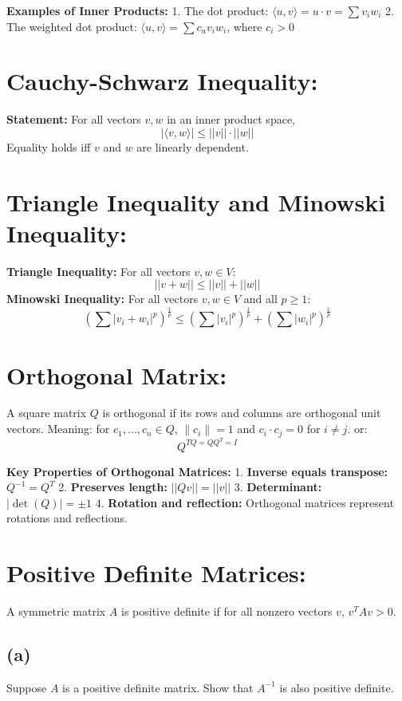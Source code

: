 \documentclass[11pt]{article}
\begin{document}
    \textbf{Examples of Inner Products:}
    1.
    The dot product: $\langle u, v \rangle = u \cdot v = \sum v_i w_i$
    2.
    The weighted dot product: $\langle u, v \rangle = \sum c_u v_i w_i$, where $c_i > 0$

    \section{Cauchy-Schwarz Inequality:}\label{sec:cauchy-schwarz}
    \textbf{Statement:} For all vectors $v, w$ in an inner product space,
    \[|\langle v, w \rangle| \leq ||v|| \cdot ||w||\]
    Equality holds iff $v$ and $w$ are linearly dependent.

    \section{Triangle Inequality and Minowski Inequality:}\label{sec:triangle}
    \textbf{Triangle Inequality:} For all vectors $v, w \in V$:
    \[||v+w|| \leq ||v|| + ||w||\]
    \textbf{Minowski Inequality:} For all vectors $v, w \in V$ and all $p \geq 1$:
    \[(\sum |v_i + w_i|^p)^{\frac{1}{p}} \leq (\sum |v_i|^p)^{\frac{1}{p}} + (\sum |w_i|^p)^{\frac{1}{p}}\]

    \section{Orthogonal Matrix:}
    A square matrix $Q$ is orthogonal if its rows and columns are orthogonal unit vectors.
    Meaning: for $c_1, \ldots, c_n \in Q$, $\|c_i\|=1$ and $c_i \cdot c_j = 0$ for $i \neq j$.
    or:\\
    \[Q^{TQ=QQ^T=I}\]

    \textbf{Key Properties of Orthogonal Matrices:}
    1.
    \textbf{Inverse equals transpose:} $Q^{-1}=Q^T$
    2.
    \textbf{Preserves length:} $||Qv||=||v||$
    3.
    \textbf{Determinant:} $|\det(Q)|= \pm 1$
    4.
    \textbf{Rotation and reflection:} Orthogonal matrices represent rotations and reflections.

    \section{Positive Definite Matrices:}
    A symmetric matrix $A$ is positive definite if for all nonzero vectors $v$, $v^TAv > 0$.

    \subsection*{(a)} Suppose $A$ is a positive definite matrix.
    Show that $A^{-1}$ is also positive definite.
\end{document}
